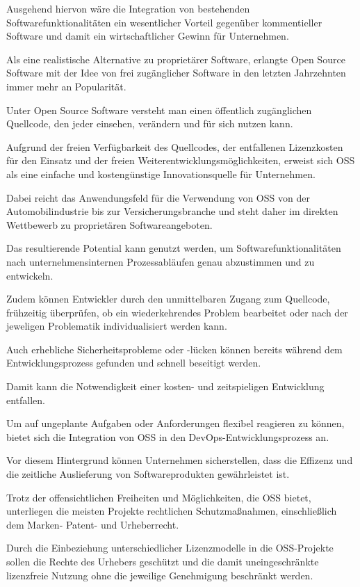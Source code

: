 Ausgehend hiervon wäre die Integration von bestehenden Softwarefunktionalitäten ein wesentlicher Vorteil gegenüber kommentieller Software und damit ein wirtschaftlicher Gewinn für Unternehmen. 

Als eine realistische Alternative zu proprietärer Software, erlangte Open Source Software mit der Idee von frei zugänglicher Software in den letzten Jahrzehnten immer mehr an Popularität.\cite[S. 21,22]{allmann_open_2019} 

Unter Open Source Software versteht man einen öffentlich zugänglichen Quellcode, den jeder einsehen, verändern und für sich nutzen kann.

Aufgrund der freien Verfügbarkeit des Quellcodes, der entfallenen Lizenzkosten für den Einsatz und der freien Weiterentwicklungsmöglichkeiten, erweist sich OSS als eine einfache und kostengünstige Innovationsquelle für Unternehmen.  

Dabei reicht das Anwendungsfeld für die Verwendung von OSS von der Automobilindustrie bis zur Versicherungsbranche und steht daher im direkten Wettbewerb zu proprietären Softwareangeboten.\cite{bitkom_ev_open_nodate}

Das resultierende Potential kann genutzt werden, um Softwarefunktionalitäten nach unternehmensinternen Prozessabläufen genau abzustimmen und zu entwickeln.

Zudem können Entwickler durch den unmittelbaren Zugang zum Quellcode, frühzeitig überprüfen, ob ein wiederkehrendes Problem bearbeitet oder nach der jeweligen Problematik individualisiert werden kann.

Auch erhebliche Sicherheitsprobleme oder -lücken können bereits während dem Entwicklungsprozess gefunden und schnell beseitigt werden.

Damit kann die Notwendigkeit einer kosten- und zeitspieligen Entwicklung entfallen. 

Um auf ungeplante Aufgaben oder Anforderungen flexibel reagieren zu können, bietet sich die Integration von OSS in den DevOps-Entwicklungsprozess an.    

Vor diesem Hintergrund können Unternehmen sicherstellen, dass die Effizenz und die zeitliche Auslieferung von Softwareprodukten gewährleistet ist. 

Trotz der offensichtlichen Freiheiten und Möglichkeiten, die OSS bietet, unterliegen die meisten Projekte rechtlichen Schutzmaßnahmen, einschließlich dem Marken- Patent- und Urheberrecht.

Durch die Einbeziehung unterschiedlicher Lizenzmodelle in die OSS-Projekte sollen die Rechte des Urhebers geschützt und die damit uneingeschränkte lizenzfreie Nutzung ohne die jeweilige Genehmigung beschränkt werden. 

